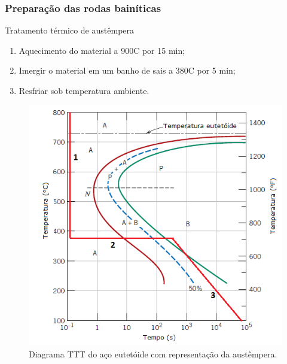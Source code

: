\documentclass{beamer}
\begin{document}
\begin{frame}
\frametitle{Preparação das rodas bainíticas}

	Tratamento térmico de austêmpera
	\begin{enumerate}
		\item Aquecimento do material a 900\textdegree C por 15 min;
		\item Imergir o material em um banho de sais a 380\textdegree C por 5 min;
		\item Resfriar sob temperatura ambiente.
		
	\end{enumerate}


	\begin{table}[H]
		\centering
		\caption{Parâmetros utilizados na austêmpera.}
		\label{tab:parametros_austempera}%
	\end{table}%

\end{frame}
	
\begin{frame}
\begin{figure}
	\centering
	\includegraphics[height=0.8\textheight]{austempera}
	\caption{Diagrama TTT do aço eutetóide com representação da austêmpera.}
	\label{fig:austempera}
\end{figure}
\end{frame}
\end{document}
